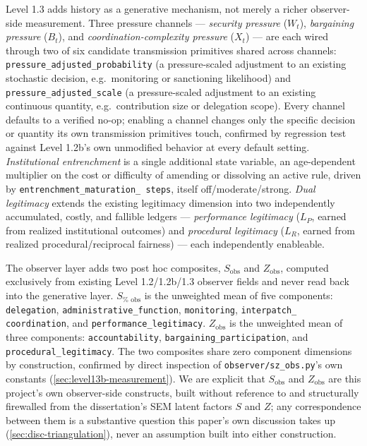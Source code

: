 Level 1.3 adds history as a generative mechanism, not merely a
richer observer-side measurement. Three pressure channels ---
\textit{security pressure} ($W_t$), \textit{bargaining pressure} ($B_t$),
and \textit{coordination-complexity pressure} ($X_t$) --- are each wired
through two of six candidate transmission primitives shared across
channels: \texttt{pressure\_adjusted\_probability} (a pressure-scaled
adjustment to an existing stochastic decision, e.g.\ monitoring or
sanctioning likelihood) and \texttt{pressure\_adjusted\_scale} (a
pressure-scaled adjustment to an existing continuous quantity, e.g.\
contribution size or delegation scope). Every channel defaults to a
verified no-op; enabling a channel changes only the specific decision or
quantity its own transmission primitives touch, confirmed by regression
test against Level 1.2b's own unmodified behavior at every default setting.
\textit{Institutional entrenchment} is a single additional state variable,
an age-dependent multiplier on the cost or difficulty of amending or
dissolving an active rule, driven by \texttt{entrenchment\_maturation\_%
steps}, itself off/moderate/strong. \textit{Dual legitimacy} extends the
existing legitimacy dimension into two independently accumulated, costly,
and fallible ledgers --- \textit{performance legitimacy} ($L_P$, earned
from realized institutional outcomes) and \textit{procedural legitimacy}
($L_R$, earned from realized procedural/reciprocal fairness) --- each
independently enableable.

The observer layer adds two post hoc composites, $S_{\text{obs}}$ and
$Z_{\text{obs}}$, computed exclusively from existing Level 1.2/1.2b/1.3
observer fields and never read back into the generative layer. $S_{\text{%
obs}}$ is the unweighted mean of five components: \texttt{delegation},
\texttt{administrative\_function}, \texttt{monitoring}, \texttt{interpatch\_%
coordination}, and \texttt{performance\_legitimacy}. $Z_{\text{obs}}$ is
the unweighted mean of three components: \texttt{accountability},
\texttt{bargaining\_participation}, and \texttt{procedural\_legitimacy}.
The two composites share zero component dimensions by construction,
confirmed by direct inspection of \texttt{observer/sz\_obs.py}'s own
constants (\cref{sec:level13b-measurement}). We are explicit that
$S_{\text{obs}}$ and $Z_{\text{obs}}$ are this project's own observer-side
constructs, built without reference to and structurally firewalled from
the dissertation's SEM latent factors $S$ and $Z$; any correspondence
between them is a substantive question this paper's own discussion takes
up (\cref{sec:disc-triangulation}), never an assumption built into either
construction.

